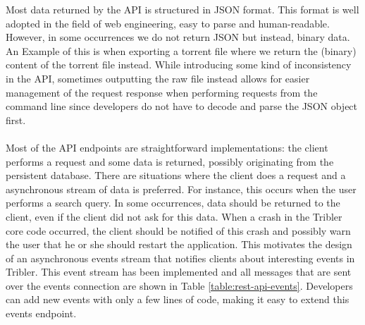 Most data returned by the API is structured in JSON format. This format is well adopted in the field of web engineering, easy to parse and human-readable. However, in some occurrences we do not return JSON but instead, binary data. An Example of this is when exporting a torrent file where we return the (binary) content of the torrent file instead. While introducing some kind of inconsistency in the API, sometimes outputting the raw file instead allows for easier management of the request response when performing requests from the command line since developers do not have to decode and parse the JSON object first.\\\\
Most of the API endpoints are straightforward implementations: the client performs a request and some data is returned, possibly originating from the persistent database. There are situations where the client does a request and a asynchronous stream of data is preferred. For instance, this occurs when the user performs a search query. In some occurrences, data should be returned to the client, even if the client did not ask for this data. When a crash in the Tribler core code occurred, the client should be notified of this crash and possibly warn the user that he or she should restart the application. This motivates the design of an asynchronous events stream that notifies clients about interesting events in Tribler. This event stream has been implemented and all messages that are sent over the events connection are shown in Table \ref{table:rest-api-events}. Developers can add new events with only a few lines of code, making it easy to extend this events endpoint.\\

